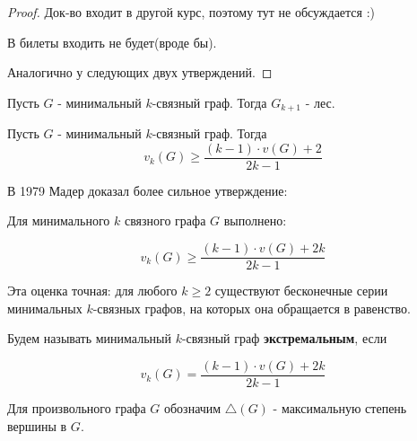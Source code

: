 \begin{proof}
	Док-во входит в другой курс, поэтому тут не обсуждается :)

	В билеты входить не будет(вроде бы).

	Аналогично у следующих двух утверждений.
\end{proof}

\begin{thm} \label{theorem:3_0}
	Пусть $G$ - минимальный  $k$-связный граф.
	Тогда  $G_{k + 1}$ - лес.
\end{thm}

\begin{crly}[W. Mader, 1972]
	Пусть $G$ - минимальный  $k$-связный граф.
	Тогда 
	 \[
		v_k(G) \geqslant \frac{(k - 1) \cdot v(G) + 2}{2k - 1}
	\] 
\end{crly}

В 1979 Мадер доказал более сильное утверждение:

\begin{thm} \label{theorem:3_1}
	Для минимального $k$ связного графа  $G$ выполнено:

	\[
		v_k(G) \geqslant \frac{(k - 1) \cdot v(G) + 2k}{2k - 1}
	\] 

\end{thm}

Эта оценка точная: для любого $k \geqslant 2$ существуют бесконечные серии минимальных  $k$-связных графов, на которых она обращается в равенство.

\begin{df}
	Будем называть минимальный $k$-связный граф \textbf{экстремальным}, если 

	 \[
		v_k(G) = \frac{(k - 1) \cdot v(G) + 2k}{2k - 1}
	\] 
\end{df}

\begin{prop}[$\triangle$]
	Для произвольного графа  $G$ обозначим  $\triangle(G)$ - максимальную степень вершины в  $G$.
\end{prop}

